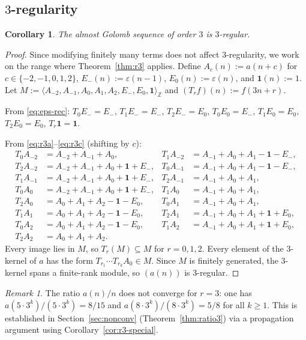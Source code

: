 \documentclass[12pt]{article}
\newtheorem{corollary}[theorem]{Corollary}
\theoremstyle{definition}
\theoremstyle{remark}
\newtheorem{remark}[theorem]{Remark}
\begin{document}
\subsection{$3$-regularity}

\begin{corollary}\label{cor:r3regular}
The almost Golomb sequence of order $3$ is $3$-regular.
\end{corollary}

\begin{proof}
Since modifying finitely many terms does not affect $3$-regularity,
we work on the range where Theorem~\ref{thm:r3} applies.
Define $A_c(n):=a(n+c)$ for $c\in\{-2,-1,0,1,2\}$,
$E_-(n):=\varepsilon(n-1)$, $E_0(n):=\varepsilon(n)$, and $\mathbf{1}(n):=1$.
Let $M:=\langle A_{-2},A_{-1},A_0,A_1,A_2,E_-,E_0,\mathbf{1}\rangle_{\mathbb{Z}}$
and $(T_rf)(n):=f(3n+r)$.

From \eqref{eq:eps-rec}:
$T_0E_-=E_-$, $T_1E_-=E_-$, $T_2E_-=E_0$,
$T_0E_0=E_-$, $T_1E_0=E_0$, $T_2E_0=E_0$,
$T_r\mathbf{1}=\mathbf{1}$.

From \eqref{eq:r3a}--\eqref{eq:r3c} (shifting by $c$):
\begin{align*}
T_0A_{-2}&=A_{-2}+A_{-1}+A_0, &
T_1A_{-2}&=A_{-1}+A_0+A_1-\mathbf{1}-E_-, \\
T_2A_{-2}&=A_{-2}+A_{-1}+A_0+\mathbf{1}+E_-, &
T_0A_{-1}&=A_{-1}+A_0+A_1-\mathbf{1}-E_-, \\
T_1A_{-1}&=A_{-2}+A_{-1}+A_0+\mathbf{1}+E_-, &
T_2A_{-1}&=A_{-1}+A_0+A_1, \\
T_0A_0   &=A_{-2}+A_{-1}+A_0+\mathbf{1}+E_-, &
T_1A_0   &=A_{-1}+A_0+A_1, \\
T_2A_0   &=A_0+A_1+A_2-\mathbf{1}-E_0, &
T_0A_1   &=A_{-1}+A_0+A_1, \\
T_1A_1   &=A_0+A_1+A_2-\mathbf{1}-E_0, &
T_2A_1   &=A_{-1}+A_0+A_1+\mathbf{1}+E_0, \\
T_0A_2   &=A_0+A_1+A_2-\mathbf{1}-E_0, &
T_1A_2   &=A_{-1}+A_0+A_1+\mathbf{1}+E_0, \\
T_2A_2   &=A_0+A_1+A_2.
\end{align*}
Every image lies in $M$, so $T_r(M)\subseteq M$ for $r=0,1,2$.
Every element of the $3$-kernel of $a$ has the form $T_{r_1}\cdots T_{r_k}A_0\in M$.
Since $M$ is finitely generated, the $3$-kernel spans a finite-rank module,
so $(a(n))$ is $3$-regular.
\end{proof}

\begin{remark}
The ratio $a(n)/n$ does not converge for $r=3$: one has
$a(5\cdot 3^k)/(5\cdot 3^k)=8/15$ and $a(8\cdot 3^k)/(8\cdot 3^k)=5/8$
for all $k\ge 1$. This is established in Section~\ref{sec:nonconv}
(Theorem~\ref{thm:ratio3}) via a propagation argument using
Corollary~\ref{cor:r3-special}.
\end{remark}
\end{document}
